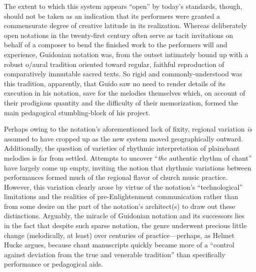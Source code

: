 

    The extent to which this system appears ``open'' by today's standards, though, should not be taken as an indication that its performers were granted a commensurate degree of creative latitude in its realization. Whereas deliberately open notations in the twenty-first century often serve as tacit invitations on behalf of a composer to bend the finished work to the performers will and experience, Guidonian notation was, from the outset intimately bound up with a robust o/aural tradition oriented toward regular, faithful reproduction of comparatively immutable sacred texts. So rigid and commonly-understood was this tradition, apparently, that Guido saw no need to render details of its execution in his notation, save for the melodies themselves which, on account of their prodigious quantity and the difficulty of their memorization, formed the main pedagogical stumbling-block of his project. 

    Perhaps owing to the notation's aforementioned lack of fixity, regional variation \textit{is} assumed to have cropped up as the new system moved geographically outward.\autocite[466]{Hucke_1980} Additionally, the question of varieties of rhythmic interpretation of plainchant melodies is far from settled. Attempts to uncover ``\textit{the} authentic rhythm of chant''\autocite[319]{Brunner_1982} have largely come up empty, inviting the notion that rhythmic variations between performances formed much of the regional flavor of church music practice. However, this variation clearly arose by virtue of the notation's ``technological'' limitations and the realities of pre-Enlightenment communication rather than from some desire on the part of the notation's architect(s) to draw out these distinctions. Arguably, the miracle of Guidonian notation and its successors lies in the fact that despite such sparse notation, the genre underwent precious little change (melodically, at least) over centuries of practice---perhaps, as Helmet Hucke argues, because chant manuscripts quickly became more of a ``control against deviation from the true and venerable tradition'' than specifically performance or pedagogical aids.\autocite[448]{Hucke_1980}

